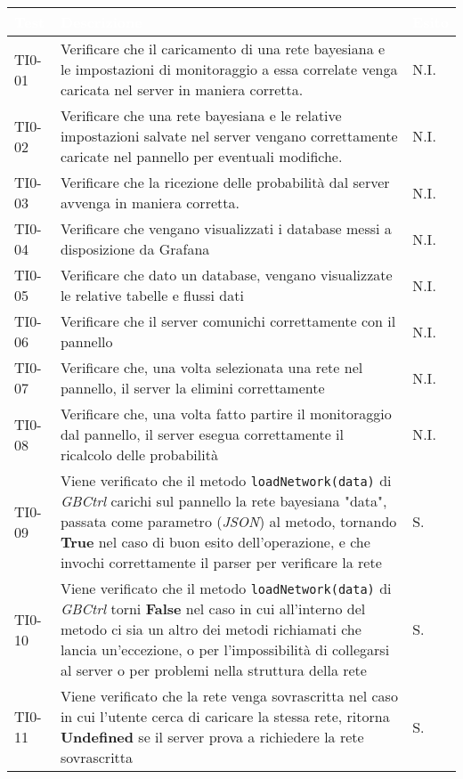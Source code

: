 \begin{longtable}{|C{.15\textwidth}|m{.66\textwidth}|C{.10\textwidth}|}
\hline
{}\textbf{\textcolor{white}{Test}} & \textbf{\textcolor{white}{Descrizione}} & \textbf{\textcolor{white}{Esito}}\\
\hline \hline
\endhead

TI0-01 & Verificare che il caricamento di una rete bayesiana e le impostazioni di monitoraggio a essa correlate venga caricata nel server in maniera corretta. & N.I. \\
\hline
{} TI0-02 & Verificare che una rete bayesiana e le relative impostazioni salvate nel server vengano correttamente caricate nel pannello per eventuali modifiche. & N.I. \\
\hline
TI0-03 & Verificare che la ricezione delle probabilità dal server avvenga in maniera corretta. & N.I. \\
\hline
{} TI0-04 & Verificare che vengano visualizzati i database messi a disposizione da Grafana & N.I. \\
\hline
TI0-05 & Verificare che dato un database, vengano visualizzate le relative tabelle e flussi dati & N.I. \\
\hline
{}TI0-06 & Verificare che il server comunichi correttamente con il pannello & N.I. \\
\hline
TI0-07 & Verificare che, una volta selezionata una rete nel pannello, il server la elimini correttamente & N.I. \\
\hline 
{}TI0-08 & Verificare che, una volta fatto partire il monitoraggio dal pannello, il server esegua correttamente il ricalcolo delle probabilità & N.I. \\  
\hline
TI0-09 & Viene verificato che il metodo \texttt{loadNetwork(data)} di \textit{GBCtrl} carichi sul pannello la rete bayesiana "data", passata come parametro (\textit{JSON}) al metodo, tornando \textbf{True} nel caso di buon esito dell'operazione, e che invochi correttamente il parser per verificare la rete & S.\\
\hline
{}TI0-10 & Viene verificato che il metodo \texttt{loadNetwork(data)} di \textit{GBCtrl} torni \textbf{False} nel caso in cui all'interno del metodo ci sia un altro dei metodi richiamati che lancia un'eccezione, o per l'impossibilità di collegarsi al server o per problemi nella struttura della rete  & S.\\
\hline
TI0-11 & Viene verificato che la rete venga sovrascritta nel caso in cui l'utente cerca di caricare la stessa rete, ritorna \textbf{Undefined} se il server prova a richiedere la rete sovrascritta & S. \\

\end{longtable}

